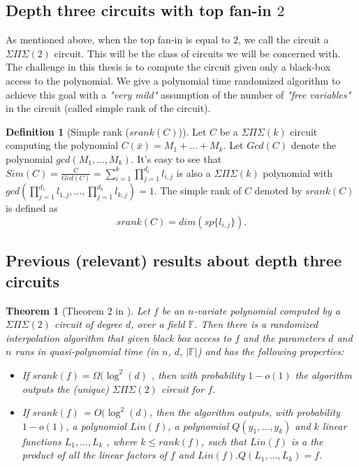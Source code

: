 \documentclass[12pt]{caltech_thesis}
\theoremstyle{plain}
\newtheorem{theorem}{Theorem}
\theoremstyle{definition}
\newtheorem{definition}{Definition}
\newcommand{\F}{\mathbb{F}}
\newcommand{\B}[1]{\bar{#1}}
\begin{document}
\subsection{Depth three circuits with top fan-in $2$}
As mentioned above, when the top fan-in is equal to $2$, we call the circuit a $\Sigma\Pi\Sigma(2)$ circuit. This will be the
class of circuits we will be concerned with. The challenge in this thesis is to compute the circuit given only a black-box access to the 
polynomial. We give a polynomial time randomized algorithm to achieve this goal with a \emph{"very mild"} assumption of the number
of \emph{"free variables"} in the circuit (called simple rank of the circuit).
\begin{definition}[Simple rank ($srank(C)$)]\label{defn:simplerank}
 Let $C$ be a $\Sigma\Pi\Sigma(k)$ circuit computing the polynomial $C(\B{x}) = M_1+\ldots + M_k$. Let $Gcd(C)$ denote the polynomial
 $gcd(M_1,\ldots,M_k)$. It's easy to see that $Sim(C)=\frac{C}{Gcd(C)} = \sum\limits_{i=1}^k\prod\limits_{j=1}^{d_i}l_{i,j}$
 is also a $\Sigma\Pi\Sigma(k)$ polynomial with $gcd(\prod\limits_{j=1}^{d_1}l_{1,j}, \ldots , \prod\limits_{j=1}^{d_k}l_{k,j}) = 1$. 
 The simple rank of $C$ denoted by $srank(C)$ is defined as
 \[
  srank(C) = dim(sp\{l_{i,j} \}).
 \]

 
\end{definition}



\subsection{Previous (relevant) results about depth three circuits}

\begin{theorem}[Theorem $2$ in \cite{Shpilka07}]
Let $f$ be an $n$-variate polynomial computed by a $\Sigma\Pi\Sigma(2)$ circuit of degree
$d$, over a field $\F$. Then there is a randomized interpolation algorithm that given black box
access to $f$ and the parameters $d$ and $n$ runs in quasi-polynomial time (in $n$, $d$, $|\F|$) and has
the following properties:
\begin{itemize}
 \item If $srank(f) = \Omega(\log^2 {(d)}$ , then with probability $1-o(1)$ the algorithm outputs the
(unique) $\Sigma\Pi\Sigma(2)$ circuit for $f$.
\item If $srank(f)$ = $O (\log^2{(d)}$, then the algorithm outputs, with probability $1-o(1)$, a polynomial $Lin(f)$, a polynomial $Q(y_1,\ldots,y_k)$ and $k$ linear functions $L_1,\ldots,L_k$ , where
$k \leq rank(f)$, such that $Lin(f)$ is a the product of all the linear factors of $f$ and
$Lin(f).Q(L_1,\ldots,L_k) = f$.
\end{itemize}
\end{theorem}
\end{document}
